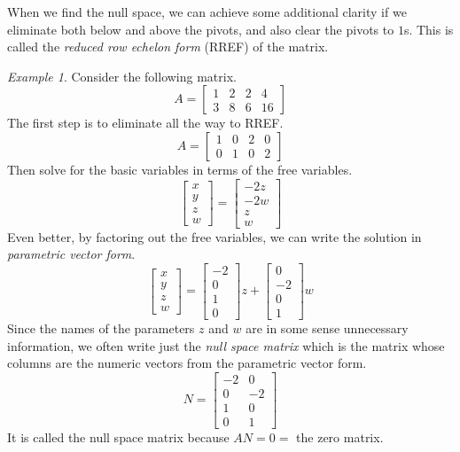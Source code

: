 \documentclass[11pt,oneside]{amsbook}
\theoremstyle{definition}
\theoremstyle{plain}
\theoremstyle{definition}
\theoremstyle{remark}
\newtheorem{example}[theorem]{Example}
\numberwithin{equation}{section}
\numberwithin{figure}{section}
\begin{document}
When we find the null space, we can achieve some additional clarity if we eliminate both below and above the pivots, and also clear the pivots to $1$s. This is called the \emph{reduced row echelon form} (RREF) of the matrix.

\begin{example}
  Consider the following matrix.
  \[A=\begin{bmatrix}1&2&2&4\\3&8&6&16\end{bmatrix}
  \]
  The first step is to eliminate all the way to RREF.
  \[A=\begin{bmatrix}1&0&2&0\\0&1&0&2\end{bmatrix}
  \]
  Then solve for the basic variables in terms of the free variables.
  \[\begin{bmatrix}x\\y\\z\\w\end{bmatrix}
  =\begin{bmatrix}-2z\\-2w\\z\\w\end{bmatrix}
  \]
  Even better, by factoring out the free variables, we can write the solution in \emph{parametric vector form}.
  \[\begin{bmatrix}x\\y\\z\\w\end{bmatrix}
    =\begin{bmatrix}-2\\0\\1\\0\end{bmatrix}z
    +\begin{bmatrix}0\\-2\\0\\1\end{bmatrix}w
  \]
  Since the names of the parameters $z$ and $w$ are in some sense unnecessary information, we often write just the \emph{null space matrix} which is the matrix whose columns are the numeric vectors from the parametric vector form.
  \[N=\begin{bmatrix}-2&0\\0&-2\\1&0\\0&1\end{bmatrix}
  \]
  It is called the null space matrix because $AN=0=$ the zero matrix.
\end{example}
\end{document}
